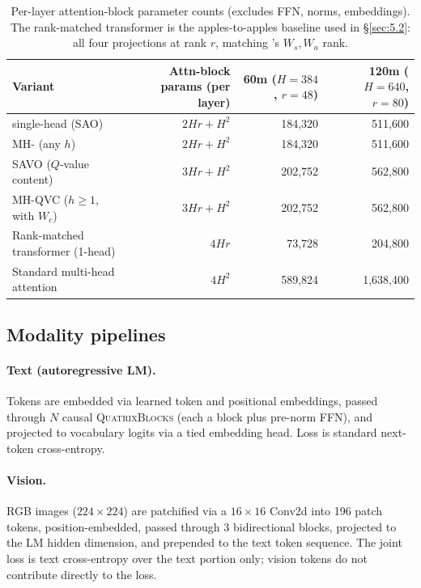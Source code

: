 \begin{table}[H]
\centering
\small
\setlength{\tabcolsep}{3pt}
\renewcommand{\arraystretch}{1.2}
\begin{tabular*}{\linewidth}{@{\extracolsep{\fill}}lrrr}
\toprule
Variant & Attn-block params (per layer) & 60m ($H{=}384$, $r{=}48$) & 120m ($H{=}640$, $r{=}80$) \\
\midrule
\QC{} single-head (SAO) & $2Hr + H^2$ & 184,320 & 511,600 \\
MH-\QC{} (any $h$) & $2Hr + H^2$ & 184,320 & 511,600 \\
SAVO ($Q$-value content) & $3Hr + H^2$ & 202,752 & 562,800 \\
MH-QVC ($h \geq 1$, with $W_c$) & $3Hr + H^2$ & 202,752 & 562,800 \\
\midrule
Rank-matched transformer (1-head) & $4Hr$ & 73,728 & 204,800 \\
Standard multi-head attention & $4H^2$ & 589,824 & 1,638,400 \\
\bottomrule
\end{tabular*}
\caption{Per-layer attention-block parameter counts (excludes FFN, norms, embeddings). The rank-matched transformer is the apples-to-apples baseline used in \S\ref{sec:5.2}: all four projections at rank $r$, matching \QC{}'s $W_s, W_a$ rank.}
\label{tab:1}
\end{table}

\subsection{Modality pipelines}\label{sec:3.3}

\paragraph{Text (autoregressive LM).} Tokens are embedded via learned token and positional embeddings, passed through $N$ causal \textsc{QuatrixBlocks} (each a \QC{} block plus pre-norm FFN), and projected to vocabulary logits via a tied embedding head. Loss is standard next-token cross-entropy.

\paragraph{Vision.} RGB images ($224\times224$) are patchified via a $16\times16$ Conv2d into 196 patch tokens, position-embedded, passed through 3 bidirectional \QCBi{} blocks, projected to the LM hidden dimension, and prepended to the text token sequence. The joint loss is text cross-entropy over the text portion only; vision tokens do not contribute directly to the loss.

